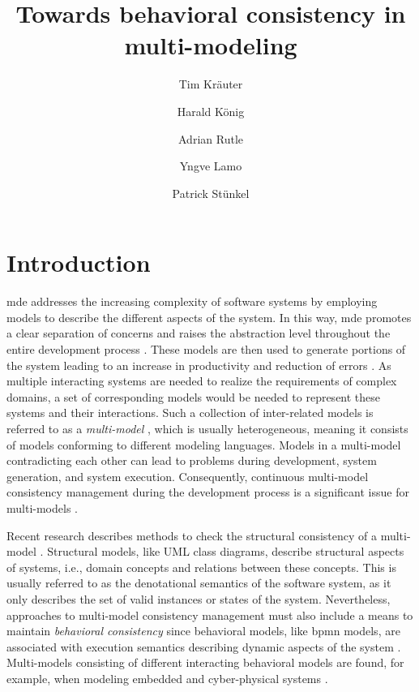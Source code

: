 \documentclass{jot}
\title{Towards behavioral consistency in multi-modeling}
\author[$\ast$]{Tim Kräuter}
\author[$\ast\dagger$]{Harald König}
\author[$\ast$]{Adrian Rutle}
\author[$\ast$]{Yngve Lamo}
\author[$\ddagger$]{Patrick Stünkel}
\affil[$\ast$]{Western Norway University of Applied Sciences, Bergen, Norway}
\affil[$\dagger$]{University of Applied Sciences, FHDW, Hannover, Germany}
\affil[$\ddagger$]{Haukeland Universitetssykehus, Bergen, Norway}
\begin{document}
    
\maketitle
{}


\section{Introduction} \label{sec:introduction}
\gls*{mde} addresses the increasing complexity of software systems by employing models to describe the different aspects of the system.
In this way, \gls*{mde} promotes a clear separation of concerns and raises the abstraction level throughout the entire development process \cite{franceModeldrivenDevelopmentComplex2007}.
These models are then used to generate portions of the system leading to an increase in productivity and reduction of errors \cite{brambillaModeldrivenSoftwareEngineering2017}.
As multiple interacting systems are needed to realize the requirements of complex domains, a set of corresponding models would be needed to represent these systems and their interactions.
Such a collection of inter-related models is referred to as a \emph{multi-model} \cite{boronatWhatMultimodelingLanguage2009, stunkelComprehensiveSystemsFormal2021}, which is usually heterogeneous, meaning it consists of models conforming to different modeling languages.
Models in a multi-model contradicting each other can lead to problems during development, system generation, and system execution.
Consequently, continuous multi-model consistency management during the development process is a significant issue for multi-models \cite{spanoudakisInconsistencyManagementSoftware2001, cicchettiMultiviewApproachesSoftware2019}.

Recent research describes methods to check the structural consistency of a multi-model \cite{stunkelComprehensiveSystemsFormal2021, klareCommonalitiesPreservingConsistency2019}.
Structural models, like UML class diagrams, describe structural aspects of systems, i.e., domain concepts and relations between these concepts.
This is usually referred to as the denotational semantics of the software system, as it only describes the set of valid instances or states of the system.
Nevertheless, approaches to multi-model consistency management must also include a means to maintain \emph{behavioral consistency} since behavioral models, like \gls*{bpmn} models, are associated with execution semantics describing dynamic aspects of the system \cite{objectmanagementgroupUnifiedModelingLanguage2017, objectmanagementgroupBusinessProcessModel2013}.
Multi-models consisting of different interacting behavioral models are found, for example, when modeling embedded and cyber-physical systems \cite{varalarsenBehavioralCoordinationOperator2015}.
\end{document}
